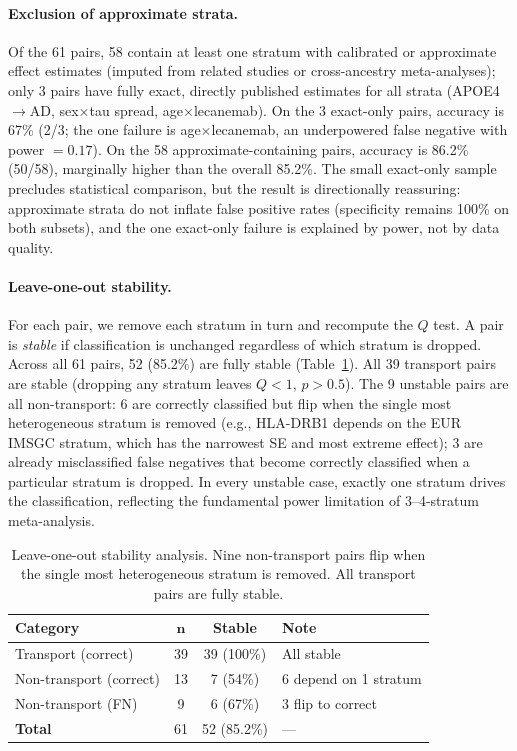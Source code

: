 \documentclass[11pt]{article}
\begin{document}
\paragraph{Exclusion of approximate strata.}
Of the 61 pairs, 58 contain at least one stratum with calibrated or approximate effect estimates (imputed from related studies or cross-ancestry meta-analyses); only 3 pairs have fully exact, directly published estimates for all strata (APOE4$\to$AD, sex$\times$tau spread, age$\times$lecanemab).
On the 3 exact-only pairs, accuracy is 67\% (2/3; the one failure is age$\times$lecanemab, an underpowered false negative with power $= 0.17$).
On the 58 approximate-containing pairs, accuracy is 86.2\% (50/58), marginally higher than the overall 85.2\%.
The small exact-only sample precludes statistical comparison, but the result is directionally reassuring: approximate strata do not inflate false positive rates (specificity remains 100\% on both subsets), and the one exact-only failure is explained by power, not by data quality.

\paragraph{Leave-one-out stability.}
For each pair, we remove each stratum in turn and recompute the $Q$ test.
A pair is \emph{stable} if classification is unchanged regardless of which stratum is dropped.
Across all 61 pairs, 52 (85.2\%) are fully stable (Table~\ref{tab:loo}).
All 39 transport pairs are stable (dropping any stratum leaves $Q < 1$, $p > 0.5$).
The 9 unstable pairs are all non-transport: 6 are correctly classified but flip when the single most heterogeneous stratum is removed (e.g., HLA-DRB1 depends on the EUR IMSGC stratum, which has the narrowest SE and most extreme effect); 3 are already misclassified false negatives that become correctly classified when a particular stratum is dropped.
In every unstable case, exactly one stratum drives the classification, reflecting the fundamental power limitation of 3--4-stratum meta-analysis.

\begin{table}[t]
\centering
\caption{Leave-one-out stability analysis. Nine non-transport pairs flip when the single most heterogeneous stratum is removed. All transport pairs are fully stable.}
\label{tab:loo}
\small
\begin{tabular}{@{}lccl@{}}
\toprule
\textbf{Category} & $\boldsymbol{n}$ & \textbf{Stable} & \textbf{Note} \\
\midrule
Transport (correct) & 39 & 39 (100\%) & All stable \\
Non-transport (correct) & 13 & 7 (54\%) & 6 depend on 1 stratum \\
Non-transport (FN) & 9 & 6 (67\%) & 3 flip to correct \\
\midrule
\textbf{Total} & 61 & 52 (85.2\%) & --- \\
\bottomrule
\end{tabular}
\end{table}
\end{document}
